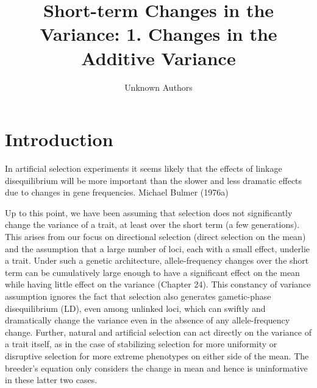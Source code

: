 \documentclass{article}
\title{Short-term Changes in the Variance:
1. Changes in the Additive Variance}
\author{Unknown Authors}
\date{}
\begin{document}
\maketitle

\begin{abstract}

\end{abstract}

\section{Introduction}
In artificial selection experiments it seems likely that the effects of linkage disequilibrium will be more important than the slower and less dramatic effects due to changes in gene frequencies. Michael Bulmer (1976a)

Up to this point, we have been assuming that selection does not significantly change the variance of a trait, at least over the short term (a few generations). This arises from our focus on directional selection (direct selection on the mean) and the assumption that a large number of loci, each with a small effect, underlie a trait. Under such a genetic architecture, allele-frequency changes over the short term can be cumulatively large enough to have a significant effect on the mean while having little effect on the variance (Chapter 24). This constancy of variance assumption ignores the fact that selection also generates gametic-phase disequilibrium (LD), even among unlinked loci, which can swiftly and dramatically change the variance even in the absence of any allele-frequency change. Further, natural and artificial selection can act directly on the variance of a trait itself, as in the case of stabilizing selection for more uniformity or disruptive selection for more extreme phenotypes on either side of the mean. The breeder's equation only considers the change in mean and hence is uninformative in these latter two cases.
\end{document}
